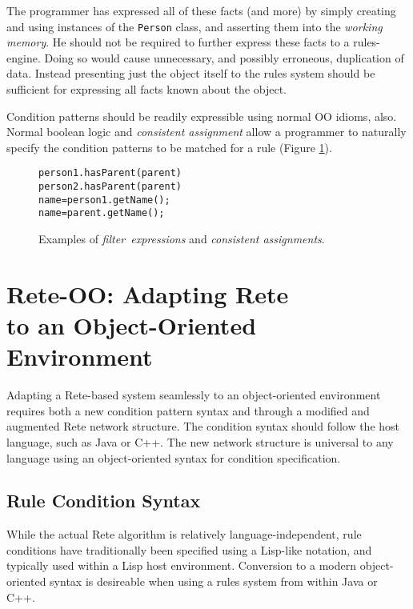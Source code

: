 \documentclass[10pt,twocolumn,letterpaper,colorhighlight]{article}
\newenvironment{codelisting}%
	{\begin{minipage}{250pt}\small\begin{alltt}}%
	{\end{alltt}\end{minipage}}
\begin{document}
The programmer has expressed all of these facts (and more) by simply creating and
using instances of the \verb|Person| class, and asserting them into
the \emph{working memory}. He should not be required
to further express these facts to a rules-engine.  Doing so would
cause unnecessary, and possibly erroneous, duplication of data.
Instead presenting just the object itself to the rules system should
be sufficient for expressing all facts known about the object.

Condition patterns should be readily expressible using normal OO
idioms, also.  Normal boolean logic and \emph{consistent assignment} 
allow a programmer to naturally specify the condition patterns to be
matched for a rule (Figure \ref{example.exprs}).

	\begin{figure}
	\begin{codelisting}
	person1.hasParent( parent )
	person2.hasParent( parent )
	name = person1.getName();
	name = parent.getName();
	\end{codelisting}

	\caption{Examples of \emph{filter~expressions} and \emph{consistent
	assignments}.}
	\label{example.exprs}
	\end{figure}


\section{Rete-OO: Adapting Rete\\to an Object-Oriented\\Environment}

Adapting a Rete-based system seamlessly to an object-oriented
environment requires both a new condition pattern syntax and through a
modified and augmented Rete network structure.  The condition syntax should
follow the host language, such as Java or C++. The new network
structure is universal to any language using an object-oriented syntax
for condition specification.

\subsection{Rule Condition Syntax}

While the actual Rete algorithm is relatively language-independent,
rule conditions have traditionally been specified using a Lisp-like
notation, and typically used within a Lisp host
environment. Conversion to a modern object-oriented syntax is
desireable when using a rules system from within Java or C++.
\end{document}
